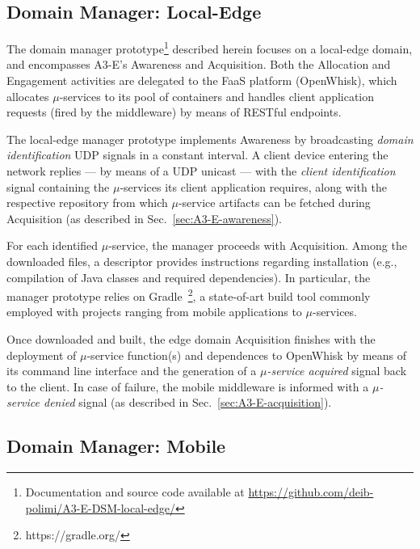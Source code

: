 \subsection{Domain Manager: Local-Edge}\label{sec:local-edge-domain-DSM}


The domain manager prototype\footnote{Documentation and source code available at \url{https://github.com/deib-polimi/A3-E-DSM-local-edge/}} described herein focuses on a local-edge domain, and encompasses A3-E's Awareness and Acquisition. Both the Allocation and Engagement activities are delegated to the FaaS platform (OpenWhisk), which allocates $\mu$-services to its pool of containers and handles client application requests (fired by the middleware) by means of RESTful endpoints.

The local-edge manager prototype implements Awareness by broadcasting \textit{domain identification} UDP signals in a constant interval. A client device entering the network replies --- by means of a UDP unicast --- with the \textit{client identification} signal containing the $\mu$-services its client application requires, along with the respective repository from which $\mu$-service artifacts can be fetched during Acquisition (as described in Sec.~\ref{sec:A3-E-awareness}). 

For each identified $\mu$-service, the manager proceeds with Acquisition. Among the downloaded files, a descriptor provides instructions regarding installation (e.g., compilation of Java classes and required dependencies). In particular, the manager prototype relies on Gradle~\footnote{https://gradle.org/}, a state-of-art build tool commonly employed with projects ranging from mobile applications to $\mu$-services.

Once downloaded and built, the edge domain Acquisition finishes with the deployment of $\mu$-service function(s) and dependences to OpenWhisk by means of its command line interface and the generation of a \textit{$\mu$-service acquired} signal back to the client. In case of failure, the mobile middleware is informed with a \textit{$\mu$-service denied} signal (as described in Sec.~\ref{sec:A3-E-acquisition}).

\subsection{Domain Manager: Mobile}\label{sec:mobile-domain-DSM}

